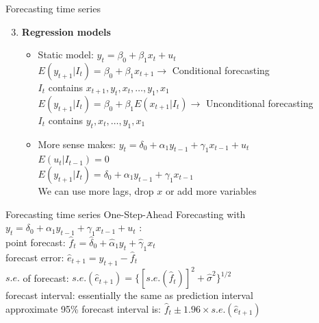 \documentclass{beamer}
\begin{document}
\begin{frame}{Forecasting time series}
\begin{enumerate}
\setcounter{enumi}{2}
\item \textbf{Regression models}
\begin{itemize}
\item Static model: $y_t=\beta_0 + \beta_1 x_t + u_t$\\
$E(y_{t+1}|I_t)=\beta_0 + \beta_1 x_{t+1} \rightarrow$ Conditional forecasting\\
$I_t$ contains $x_{t+1}, y_t, x_t,\dots, y_1, x_1$\\
$E(y_{t+1}|I_t)=\beta_0 + \beta_1 E(x_{t+1}|I_t) \rightarrow$ Unconditional forecasting\\
$I_t$ contains $y_t, x_t,\dots, y_1, x_1$\\

\vspace{0.3cm}
\item More sense makes: $y_t=\delta_0+\alpha_1 y_{t-1} + \gamma_1 x_{t-1} + u_t$\\
$E(u_t|I_{t-1})=0$\\
$E(y_{t+1}|I_t)=\delta_0+\alpha_1 y_{t-1} + \gamma_1 x_{t-1}$\\
We can use more lags, drop $x$ or add more variables
\end{itemize}
\end{enumerate}
\end{frame}


\begin{frame}{Forecasting time series}
One-Step-Ahead Forecasting with \\
\vspace{0.2cm}
$y_t=\delta_0+\alpha_1 y_{t-1} + \gamma_1 x_{t-1} + u_t $ :\\
\vspace{0.8cm}
point forecast: $\hat{f}_t = \hat{\delta}_0 + \hat{\alpha}_1 y_t + \hat{\gamma}_1 x_t$\\
\vspace{0.2cm}
forecast error: $\hat{e}_{t+1}=y_{t+1}-\hat{f}_t $\\
\vspace{0.2cm}
$\textit{s.e.}$ of forecast: $\textit{s.e.}(\hat{e}_{t+1})= \{ [\textit{s.e.} (\hat{f}_t)]^2+\hat{\sigma}^2\}^{1/2}$  \\
\vspace{0.82cm}
forecast interval: essentially the same as prediction interval \\
\vspace{0.2cm}
approximate 95\% forecast interval is:  $\hat{f}_t \pm 1.96 \! \times \! \textit{s.e.}(\hat{e}_{t+1})$
\end{frame}
\end{document}
